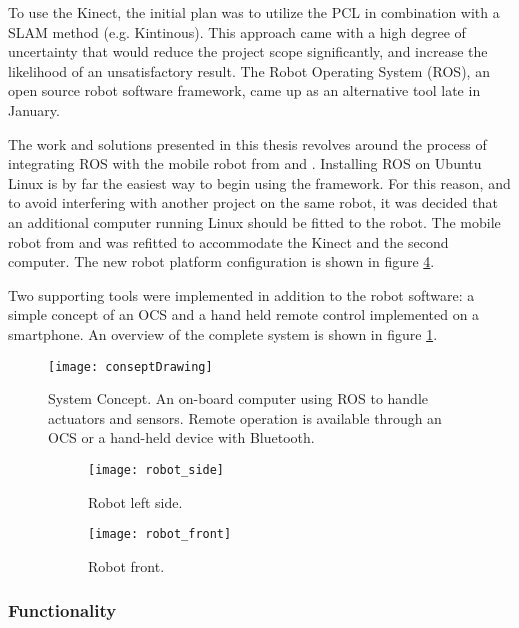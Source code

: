 To use the Kinect, the initial plan was to utilize the \ac{PCL} in combination with a \ac{SLAM} method (e.g. Kintinous\cite{Kintinous}). This approach came with a high degree of uncertainty that would reduce the project scope significantly, and increase the likelihood of an unsatisfactory result. The Robot Operating System (ROS), an open source robot software framework, came up as an alternative tool late in January. 

The work and solutions presented in this thesis revolves around the process of integrating ROS with the mobile robot from \cite{aspunvik} and \cite{berg}. Installing ROS on Ubuntu Linux is by far the easiest way to begin using the framework. For this reason, and to avoid interfering with another project on the same robot, it was decided that an additional computer running Linux should be fitted to the robot. The mobile robot from \cite{aspunvik} and \cite{berg} was refitted to accommodate the Kinect and the second computer. The new robot platform configuration is shown in figure \ref{fig:robot}.

Two supporting tools were implemented in addition to the robot software: a simple concept of an \ac{OCS} and a hand held remote control implemented on a smartphone. An overview of the complete system is shown in figure \ref{fig:conseptDrawing}.

\begin{figure}[h]
	\centering
	\texttt{[image: conseptDrawing]}
	\caption{System Concept. An on-board computer using \ac{ROS} to handle actuators and sensors. Remote operation is available through an \ac{OCS} or a hand-held device with Bluetooth.}
	\label{fig:conseptDrawing}
\end{figure}

 \begin{figure}[H]
 	\centering
 	\begin{subfigure}[b]{0.60\textwidth}
 		\texttt{[image: robot\_side]}
 		\caption{Robot left side.}
 		\label{fig:robot_side}
 	\end{subfigure}
 	\begin{subfigure}[b]{0.32\textwidth}
 		
 		\texttt{[image: robot\_front]}
 		\caption{Robot front.}
 		\label{fig:robot_front}
 	\end{subfigure}
 	\caption{}\label{fig:robot}
 \end{figure}


\subsubsection{Functionality}

